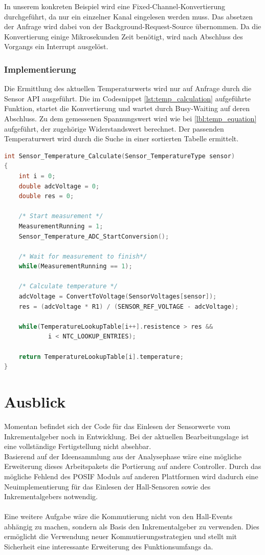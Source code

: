 In unserem konkreten Beispiel wird eine Fixed-Channel-Konvertierung durchgeführt, da nur ein einzelner Kanal eingelesen werden muss. Das absetzen der Anfrage wird dabei von der Background-Request-Source übernommen. Da die Konvertierung einige Mikrosekunden Zeit benötigt, wird nach Abschluss des Vorgangs ein Interrupt ausgelöst.

\subsubsection{Implementierung}
Die Ermittlung des aktuellen Temperaturwerts wird nur auf Anfrage durch die Sensor API ausgeführt. Die im Codesnippet \ref{lst:temp_calculation} aufgeführte Funktion, startet die Konvertierung und wartet durch Busy-Waiting auf deren Abschluss. Zu dem gemessenen Spannungswert wird wie bei \ref{lbl:temp_equation} aufgeführt, der zugehörige Widerstandswert berechnet. Der passenden Temperaturwert wird durch die Suche in einer sortierten Tabelle ermittelt.

\begin{lstlisting}[frame=single, language=c, caption=Temperaturberechnung, label=lst:temp_calculation]
int Sensor_Temperature_Calculate(Sensor_TemperatureType sensor)
{
	int i = 0;
	double adcVoltage = 0;
	double res = 0;

	/* Start measurement */
	MeasurementRunning = 1;
	Sensor_Temperature_ADC_StartConversion();

	/* Wait for measurement to finish*/
	while(MeasurementRunning == 1);

	/* Calculate temperature */
	adcVoltage = ConvertToVoltage(SensorVoltages[sensor]);
	res = (adcVoltage * R1) / (SENSOR_REF_VOLTAGE - adcVoltage);

	while(TemperatureLookupTable[i++].resistence > res && 
			i < NTC_LOOKUP_ENTRIES);

	return TemperatureLookupTable[i].temperature;
}
\end{lstlisting}

\section{Ausblick}
Momentan befindet sich der Code für das Einlesen der Sensorwerte vom Inkrementalgeber noch in Entwicklung. Bei der aktuellen Bearbeitungslage ist eine vollständige Fertigstellung nicht absehbar. \\
Basierend auf der Ideensammlung aus der Analysephase wäre eine mögliche Erweiterung dieses Arbeitspakets die Portierung auf andere Controller. Durch das mögliche Fehlend des POSIF Moduls auf anderen Plattformen wird dadurch eine Neuimplementierung für das Einlesen der Hall-Sensoren sowie des Inkrementalgebers notwendig. \\ \\
Eine weitere Aufgabe wäre die Kommutierung nicht von den Hall-Events abhängig zu machen, sondern als Basis den Inkrementalgeber zu verwenden. Dies ermöglicht die Verwendung neuer Kommutierungsstrategien und stellt mit Sicherheit eine interessante Erweiterung des Funktionsumfangs da.